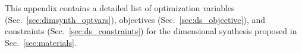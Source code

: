 %
%
%
\label{sec:app_dimsynth}

This appendix contains a detailed list of optimization variables (Sec.~\ref{sec:dimsynth_optvars}), objectives (Sec.~\ref{sec:ds_objective}), and constraints (Sec.~\ref{sec:ds_constraints}) for the dimensional synthesis proposed in Sec.~\ref{sec:materials}.

